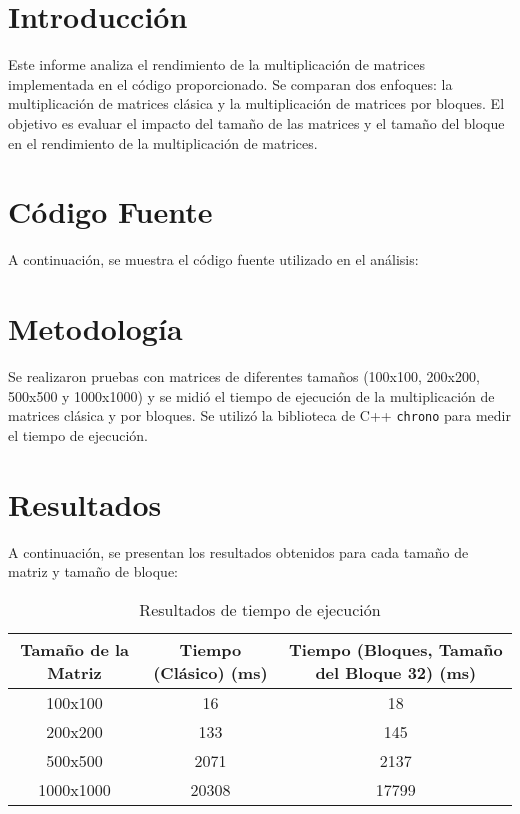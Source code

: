 \section{Introducción}
Este informe analiza el rendimiento de la multiplicación de matrices implementada en el código proporcionado. Se comparan dos enfoques: la multiplicación de matrices clásica y la multiplicación de matrices por bloques. El objetivo es evaluar el impacto del tamaño de las matrices y el tamaño del bloque en el rendimiento de la multiplicación de matrices.

\section{Código Fuente}
A continuación, se muestra el código fuente utilizado en el análisis:



\section{Metodología}
Se realizaron pruebas con matrices de diferentes tamaños (100x100, 200x200, 500x500 y 1000x1000) y se midió el tiempo de ejecución de la multiplicación de matrices clásica y por bloques. Se utilizó la biblioteca de C++ \texttt{chrono} para medir el tiempo de ejecución.

\section{Resultados}
A continuación, se presentan los resultados obtenidos para cada tamaño de matriz y tamaño de bloque:

\begin{table}[h]
\centering
\begin{tabular}{|c|c|c|}
\hline
Tamaño de la Matriz & Tiempo (Clásico) (ms) & Tiempo (Bloques, Tamaño del Bloque 32) (ms) \\
\hline
100x100 & 16 & 18 \\
\hline
200x200 & 133 & 145 \\
\hline
500x500 & 2071 & 2137 \\
\hline
1000x1000 & 20308 & 17799 \\
\hline
\end{tabular}
\caption{Resultados de tiempo de ejecución}
\end{table}

